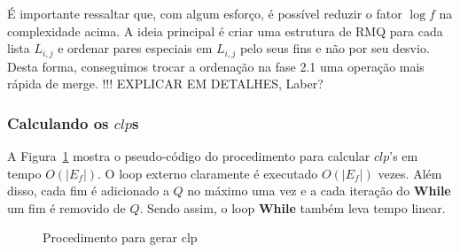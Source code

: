 \documentclass[dissertacao, brazil]{ThesisPUC}
\begin{document}
É importante ressaltar que, com algum esforço, é possível reduzir o fator 
$\log f$ na complexidade acima. A ideia principal é criar uma estrutura de RMQ
para cada lista $L_{i,j}$ e ordenar pares especiais em  $L_{i, j}$ pelo seus fins
e não por seu desvio. Desta forma, conseguimos trocar a ordenação na fase 2.1 
uma operação mais rápida de merge. !!! EXPLICAR EM DETALHES, Laber?

\subsubsection{Calculando os $clp$s}
A Figura~\ref{fig:clp} mostra o pseudo-código do procedimento
para calcular $clp$'s em tempo $O(|E_f|)$. O loop externo
claramente é executado $O(|E_f|)$ vezes. Além disso, 
cada fim é adicionado a $Q$ no máximo uma vez e a cada iteração
do {\bf While} um fim é removido de $Q$. Sendo assim,
o loop {\bf While} também leva tempo linear.


\begin{figure}


\caption{Procedimento para gerar clp}

\label{fig:clp} 

\normalsize

 \end{figure}
\end{document}
